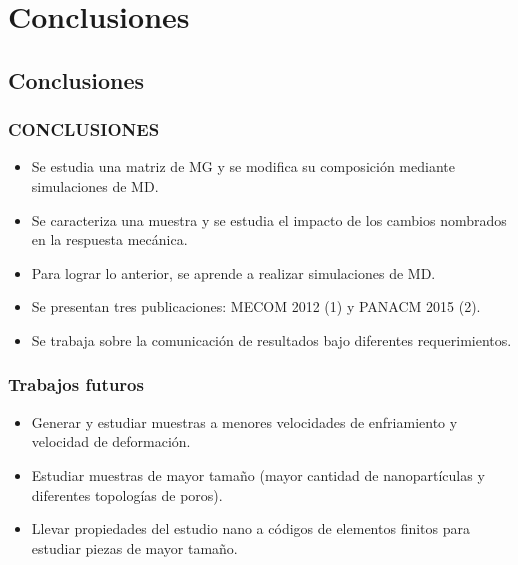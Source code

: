 
\section{Conclusiones}
\subsection{Conclusiones}

\begin{frame}
  \frametitle{CONCLUSIONES}
 \begin{itemize} 
  \item Se estudia una matriz de MG y se modifica su composición mediante simulaciones de MD.
  \vspace{0.2cm}
  \item Se caracteriza una muestra y se estudia el impacto de los cambios nombrados en la respuesta mecánica.
  \vspace{0.2cm}
  \item Para lograr lo anterior, se aprende a realizar simulaciones de MD.
  \vspace{0.2cm}
  \item Se presentan tres publicaciones: MECOM 2012 (1) y PANACM 2015 (2).
  \vspace{0.2cm}
  \item Se trabaja sobre la comunicación de resultados bajo diferentes requerimientos.
 \end{itemize}
\end{frame}

\begin{frame}
 \frametitle{Trabajos futuros}
 \vspace{0.5cm}
 \begin{itemize}
  \item Generar y estudiar muestras a menores velocidades de enfriamiento y velocidad de deformación.
  \vspace{0.5cm}
  \item Estudiar muestras de mayor tamaño (mayor cantidad de nanopartículas y diferentes topologías de poros).
  \vspace{0.5cm}
  \item Llevar propiedades del estudio nano a códigos de elementos finitos para estudiar piezas de mayor tamaño.
 \end{itemize}
\end{frame}
